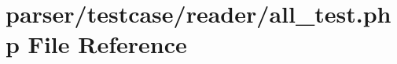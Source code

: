 \hypertarget{reader_2all__test_8php}{\section{parser/testcase/reader/all\+\_\+test.php File Reference}
\label{reader_2all__test_8php}
}
